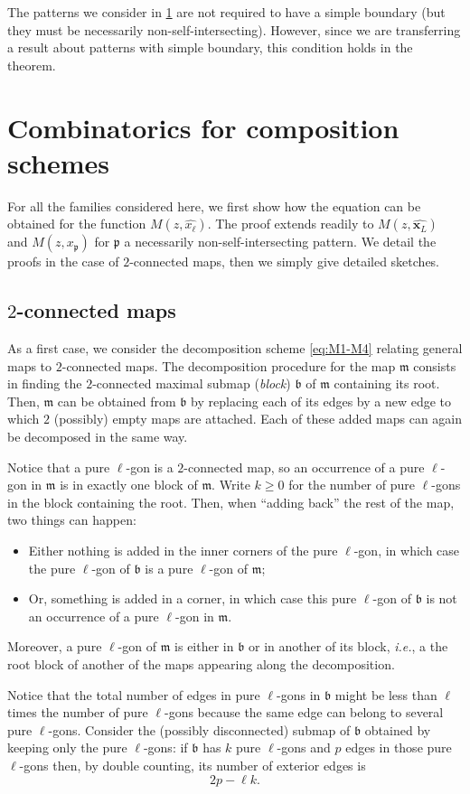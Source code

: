 \documentclass[a4paper,UKenglish,cleveref, autoref, thm-restate]{lipics-v2021}
\renewcommand{\(}{\left(}
\renewcommand{\)}{\right)}
\newcommand{\twoc}{\texorpdfstring{$2$}{2}-connected}
\newcommand{\nnsi}{necessarily non-self-intersecting}
\newcommand{\ellgon}{pure \texorpdfstring{$\ell$}{ell}-gon}
\newcommand{\ellgons}{\ellgon s}
\newcommand{\p}{\mathfrak{p}}
\newcommand{\m}{\mathfrak{m}}
\renewcommand{\b}{\mathfrak{b}}
\newcommand{\subfamily}{_L}
\newcommand{\xface}{x_{\ell}}
\newcommand{\x}{\mathbf{x}\subfamily}
\newcommand{\xellgon}{\widehat{\xface}}
\newcommand{\xallgons}{\widehat{\x}}
\newcommand{\xpatt}{x_{\p}}
\begin{document}
The patterns we consider in \cref{sec:combinatorics} are not required to have a simple boundary (but they must be \nnsi). However, since we are transferring a result about patterns with simple boundary, this condition holds in the theorem.

\section{Combinatorics for composition schemes}
\label{sec:combinatorics}
For all the families considered here, we first show how the equation can be obtained for the function $M(z,\xellgon)$. The proof extends readily to $M(z,\xallgons)$ and $M(z,\xpatt)$ for $\p$ a \nnsi{} pattern. We detail the proofs in the case of $2$-connected maps, then we simply give detailed sketches.

\subsection{\twoc{} maps}
\label{subsubsec:M1-M4-nnsi}
As a first case, we consider the decomposition scheme \cref{eq:M1-M4} relating general maps to $2$-connected maps. The decomposition procedure for the map $\m$ consists in finding the $2$-connected maximal submap (\emph{block}) $\b$ of $\m$ containing its root. Then, $\m$ can be obtained from $\b$ by replacing each of its edges by a new edge to which $2$ (possibly) empty maps are attached. Each of these added maps can again be decomposed in the same way.

Notice that a \ellgon{} is a $2$-connected map, so an occurrence of a \ellgon{} in $\m$ is in exactly one block of $\m$. Write $k\geq 0$ for the number of \ellgons{} in the block containing the root. Then, when ``adding back'' the rest of the map, two things can happen:
\begin{itemize}
    \item Either nothing is added in the inner corners of the \ellgon, in which case the \ellgon{} of $\b$ is a \ellgon{} of $\m$;
    \item Or, something is added in a corner, in which case this \ellgon{} of $\b$ is not an occurrence of a \ellgon{} in $\m$.
\end{itemize}
Moreover, a \ellgon{} of $\m$ is either in $\b$ or in another of its block, \emph{i.e.}, a the root block of another of the maps appearing along the decomposition.

Notice that the total number of edges in \ellgons{} in $\b$ might be less than $\ell$ times the number of \ellgons{} because the same edge can belong to several \ellgons{}. Consider the (possibly disconnected) submap of $\b$ obtained by keeping only the \ellgons{}: if $\b$ has $k$ \ellgons{} and $p$ edges in those \ellgons{} then, by double counting, its number of exterior edges is
\begin{equation}
\label{eq:interior-edges-l-gons}
2p - \ell k.
\end{equation}
\end{document}
